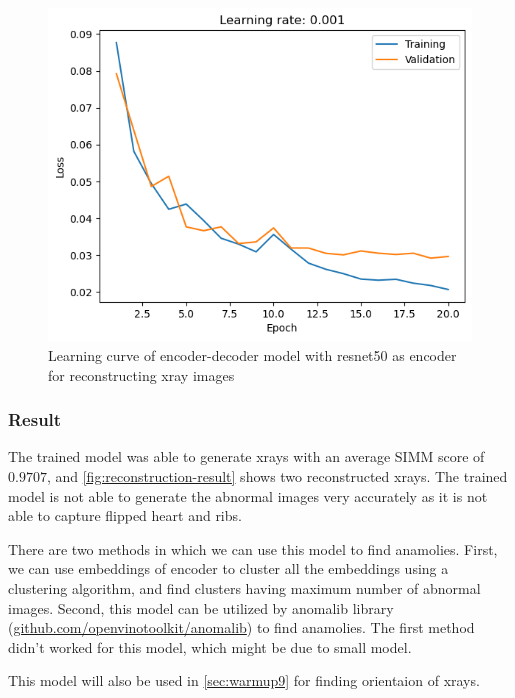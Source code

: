     \begin{figure}[htbp]
        \centering
        \includegraphics[width=\linewidth]{../plots/unsupervised-anamoly/learning.png}
        \caption{Learning curve of encoder-decoder model with resnet50 as encoder for reconstructing xray images}
        \label{fig:reconstruction-learning-curve}
    \end{figure}


    \subsubsection{Result}
    
    The trained model was able to generate xrays with an average SIMM score of $0.9707$, and \cref{fig:reconstruction-result} shows two reconstructed xrays. The trained model is not able to generate the abnormal images very accurately as it is not able to capture flipped heart and ribs.

    There are two methods in which we can use this model to find anamolies. First, we can use embeddings of encoder to cluster all the embeddings using a clustering algorithm, and find clusters having maximum number of abnormal images. Second, this model can be utilized by anomalib library (\href{https://github.com/openvinotoolkit/anomalib}{github.com/openvinotoolkit/anomalib}) to find anamolies. The first method didn't worked for this model, which might be due to small model.
 
    This model will also be used in \cref{sec:warmup9} for finding orientaion of xrays.
    
